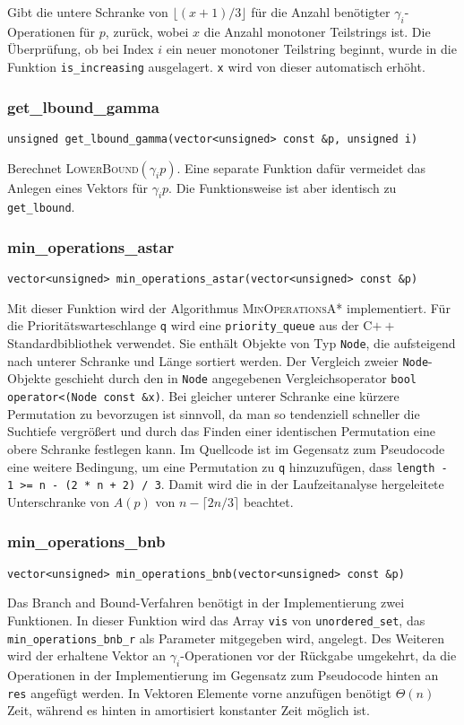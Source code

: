 \documentclass[a4paper, 10pt, ngerman]{article}
\begin{document}
\noindent Gibt die untere Schranke von $\lfloor (x + 1)/ 3 \rfloor$ für die Anzahl benötigter $\gamma_i$-Operationen für $p$, zurück, wobei $x$ die Anzahl monotoner Teilstrings ist. Die Überprüfung, ob bei Index $i$ ein neuer monotoner Teilstring beginnt, wurde in die Funktion \verb|is_increasing| ausgelagert. \verb|x| wird von dieser automatisch erhöht.

\subsubsection{get\_lbound\_gamma}
\verb|unsigned get_lbound_gamma(vector<unsigned> const &p, unsigned i)|
\medskip

\noindent Berechnet \textsc{LowerBound}$(\gamma_i p)$. Eine separate Funktion dafür vermeidet das Anlegen eines Vektors für $\gamma_i p$. Die Funktionsweise ist aber identisch zu \verb|get_lbound|.

\subsubsection{min\_operations\_astar}
\verb|vector<unsigned> min_operations_astar(vector<unsigned> const &p)|
\medskip

\noindent Mit dieser Funktion wird der Algorithmus \textsc{MinOperationsA*} implementiert. Für die Prioritätswarteschlange \verb|q| wird eine \verb|priority_queue| aus der C$++$ Standardbibliothek verwendet. Sie enthält Objekte von Typ \verb|Node|, die aufsteigend nach unterer Schranke und Länge sortiert werden. Der Vergleich zweier \verb|Node|-Objekte geschieht durch den in \verb|Node| angegebenen Vergleichsoperator \verb|bool operator<(Node const &x)|. Bei gleicher unterer Schranke eine kürzere Permutation zu bevorzugen ist sinnvoll, da man so tendenziell schneller die Suchtiefe vergrößert und durch das Finden einer identischen Permutation eine obere Schranke festlegen kann. Im Quellcode ist im Gegensatz zum Pseudocode eine weitere Bedingung, um eine Permutation zu \verb|q| hinzuzufügen, dass \verb|length - 1 >= n - (2 * n + 2) / 3|. Damit wird die in der Laufzeitanalyse hergeleitete Unterschranke von $A(p)$ von $n - \lceil 2n/3 \rceil$ beachtet.

\subsubsection{min\_operations\_bnb}
\verb|vector<unsigned> min_operations_bnb(vector<unsigned> const &p)|
\medskip

\noindent Das Branch and Bound-Verfahren benötigt in der Implementierung zwei Funktionen. In dieser Funktion wird das Array \verb|vis| von \verb|unordered_set|, das \verb|min_operations_bnb_r| als Parameter mitgegeben wird, angelegt. Des Weiteren wird der erhaltene Vektor an $\gamma_i$-Operationen vor der Rückgabe umgekehrt, da die Operationen in der Implementierung im Gegensatz zum Pseudocode hinten an \verb|res| angefügt werden. In Vektoren Elemente vorne anzufügen benötigt $\Theta(n)$ Zeit, während es hinten in amortisiert konstanter Zeit möglich ist.
\end{document}
